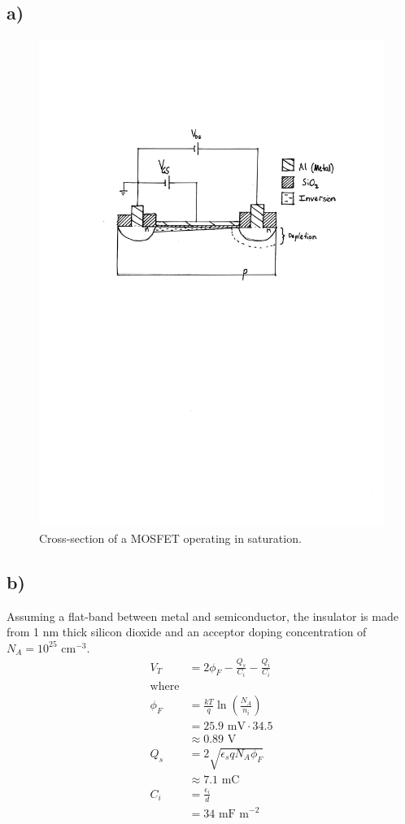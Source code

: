 \subsection*{a)}
\begin{figure}[htbp!]
	\flushright
	\includegraphics[trim={4cm 15cm 2.9cm 5cm},clip]{./img/4a}
	\caption{Cross-section of a MOSFET operating in saturation.}
\end{figure}
\subsection*{b)}
Assuming a flat-band between metal and semiconductor, the insulator is made from 1 nm thick silicon dioxide and an acceptor doping concentration of $N_A = 10^{25} \textrm{ cm}^{-3}$.
\[
\begin{aligned}
	V_T &= 2 \phi_F - \frac{Q_s}{C_i} - \frac{Q_i}{C_i} \\
	\textrm{where}\\
	\phi_F	&= \frac{k T}{q} \ln \left(\frac{N_A}{n_i}\right) \\
		&= 25.9 \textrm{ mV} \cdot 34.5 \\
		&\approx 0.89 \textrm{ V} \\
	Q_s &= 2\sqrt{\epsilon_s q N_A \phi_F} \\
		&\approx 7.1 \textrm{ mC}\\
	C_i &= \frac{\epsilon_i}{d} \\
		&= 34 \textrm{ mF m}^{-2}
\end{aligned}
\]